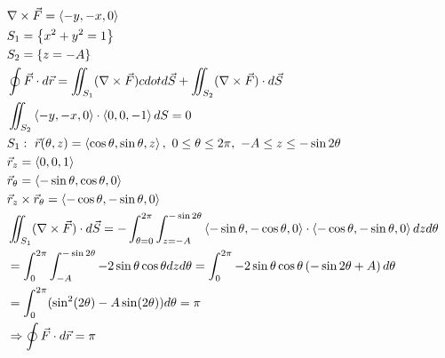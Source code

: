 \documentclass[11pt, fleqn]{article}
\begin{document}
\begin{align*}
    &\nabla\times\vec{F}=\brangle{-y,-x,0}\\
    &S_1=\brcurly{x^2+y^2=1}\\
    &S_2=\brcurly{z=-A}\\
    &\oint\vec{F}\cdot d\vec{r}=\iint_{S_1}(\nabla\times\vec{F})
    cdot d\vec{S}+\iint_{S_2}(\nabla\times\vec{F})\cdot d\vec{S}\\
    &\iint_{S_2}\brangle{-y,-x,0}\cdot\brangle{0,0,-1}dS=0\\
    &S_1:\ \vec{r}(\theta,z)=\brangle{\cos\theta,\sin\theta,z},\ 0\leq \theta\leq 2\pi,\ -A\leq z\leq -\sin 2\theta\\
    &\vec{r}_z=\brangle{0,0,1}\\
    &\vec{r}_\theta=\brangle{-\sin\theta,\cos\theta,0}\\
    &\vec{r}_z\times\vec{r}_\theta=\brangle{-\cos\theta,-\sin\theta,0}\\
    &\iint_{S_1}(\nabla\times\vec{F})\cdot d\vec{S}=-\int_{\theta=0}^{2\pi}\int_{z=-A}^{-\sin 2\theta}\brangle{-\sin\theta,-\cos\theta,0}\cdot\brangle{-\cos\theta,-\sin\theta,0}dzd\theta\\
    &=\int_0^{2\pi}\int_{-A}^{-\sin2\theta}-2\sin\theta\cos\theta dzd\theta=\int_0^{2\pi}-2\sin\theta\cos\theta\brround{-\sin2\theta+A}d\theta\\
    &=\int_0^{2\pi}(\sin^2(2\theta)-A\sin(2\theta))d\theta=\pi\\
    &\Ra\oint\vec{F}\cdot d\vec{r}=\pi
\end{align*}
\end{document}
